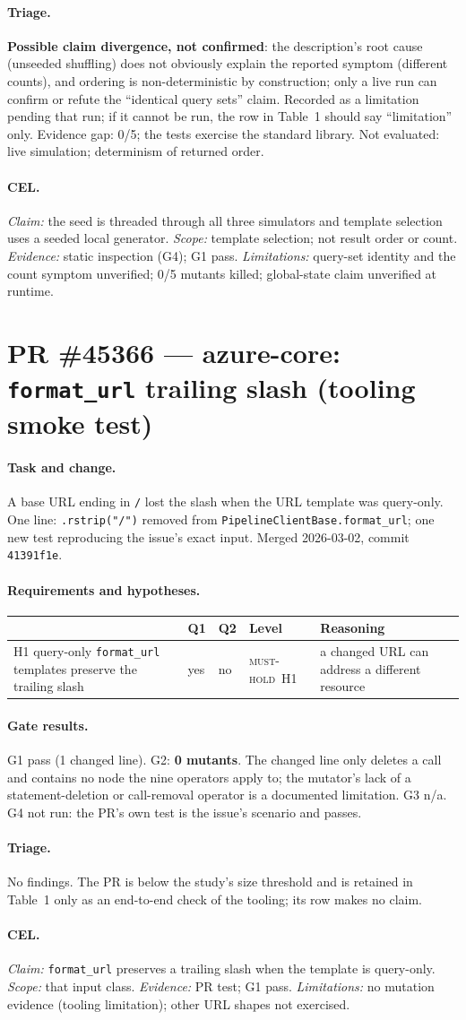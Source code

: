 \documentclass[11pt,a4paper]{article}
\newcommand{\code}[1]{\texttt{#1}}
\newcommand{\musthold}{\textsc{must-hold}}
\newcommand{\card}[1]{\clearpage\section{#1}}
\newcommand{\sub}[1]{\paragraph{#1}}
\begin{document}
\sub{Triage.} \textbf{Possible claim divergence, not confirmed}: the description's root cause (unseeded shuffling) does not obviously explain the reported symptom (different counts), and ordering is non-deterministic by construction; only a live run can confirm or refute the ``identical query sets'' claim. Recorded as a limitation pending that run; if it cannot be run, the row in Table~1 should say ``limitation'' only. Evidence gap: 0/5; the tests exercise the standard library. Not evaluated: live simulation; determinism of returned order.

\sub{CEL.} \emph{Claim:} the seed is threaded through all three simulators and template selection uses a seeded local generator. \emph{Scope:} template selection; not result order or count. \emph{Evidence:} static inspection (G4); G1 pass. \emph{Limitations:} query-set identity and the count symptom unverified; 0/5 mutants killed; global-state claim unverified at runtime.

\card{PR \#45366 — azure-core: \code{format\_url} trailing slash (tooling smoke test)}

\sub{Task and change.} A base URL ending in \code{/} lost the slash when the URL template was query-only. One line: \code{.rstrip("/")} removed from \code{PipelineClientBase.format\_url}; one new test reproducing the issue's exact input. Merged 2026-03-02, commit \code{41391f1e}.

\sub{Requirements and hypotheses.}
\begin{center}\small\begin{tabularx}{\textwidth}{p{} l l l X}
\toprule & Q1 & Q2 & Level & Reasoning \\ \midrule
H1 query-only \code{format\_url} templates preserve the trailing slash & yes & no & \musthold\ H1 & a changed URL can address a different resource \\
\bottomrule\end{tabularx}\end{center}

\sub{Gate results.} G1 pass (1 changed line). G2: \textbf{0 mutants}. The changed line only deletes a call and contains no node the nine operators apply to; the mutator's lack of a statement-deletion or call-removal operator is a documented limitation. G3 n/a. G4 not run: the PR's own test is the issue's scenario and passes.

\sub{Triage.} No findings. The PR is below the study's size threshold and is retained in Table~1 only as an end-to-end check of the tooling; its row makes no claim.

\sub{CEL.} \emph{Claim:} \code{format\_url} preserves a trailing slash when the template is query-only. \emph{Scope:} that input class. \emph{Evidence:} PR test; G1 pass. \emph{Limitations:} no mutation evidence (tooling limitation); other URL shapes not exercised.
\end{document}
